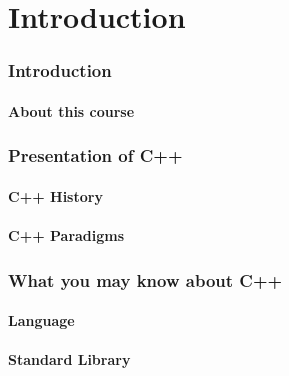 \part{Introduction}

\section{Introduction}

\subsection{About this course}


\section{Presentation of C++}

\subsection{C++ History}

\subsection{C++ Paradigms}


\section{What you may know about C++}

\subsection{Language}


\subsection{Standard Library}

